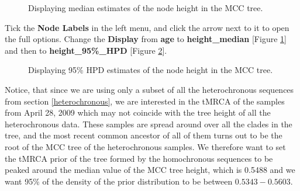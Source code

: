 \documentclass[11pt]{article}
\begin{document}
\begin{figure}[h!]
\centering
{}
\caption{\small Displaying median estimates of the node height in the MCC tree.}
\label{tMRCAmedian}
\end{figure}

\begin{framed}
Tick the \textbf{Node Labels} in the left menu, and click the arrow next to it to open the full options. Change the \textbf{Display} from \textbf{age} to \textbf{height\_median} [Figure \ref{tMRCAmedian}] and then to \textbf{height\_95\%\_HPD} [Figure \ref{tMRCA95HPD}].
\end{framed}

\begin{figure}[h!]
\centering
{}
\caption{\small Displaying 95\% HPD estimates of the node height in the MCC tree.}
\label{tMRCA95HPD}
\end{figure}

Notice, that since we are using only a subset of all the heterochronous sequences from section \ref{heterochronous}, we are interested in the tMRCA of the samples from April 28, 2009 which may not coincide with the tree height of all the heterochronous data. These samples are spread around over all the clades in the tree, and the most recent common ancestor of all of them turns out to be the root of the MCC tree of the heterochronous samples. We therefore want to set the tMRCA prior of the tree formed by the homochronous sequences to be peaked around the median value of the MCC tree height, which is 0.5488 and we want 95\% of the density of the prior distribution to be between $0.5343-0.5603$.
\end{document}
